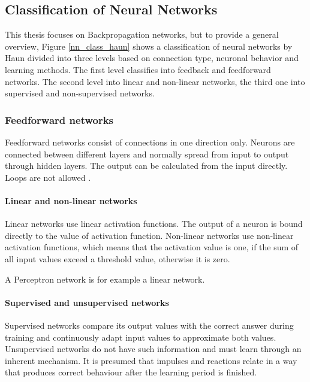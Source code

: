 \subsection{Classification of Neural
Networks}\label{classification-of-neural-networks}

This thesis focuses on Backpropagation networks, but to provide a
general overview, Figure \ref{nn_class_haun} shows a classification of
neural networks by Haun \cite{haun1998simulation} divided into three
levels based on connection type, neuronal behavior and learning methods.
The first level classifies into feedback and feedforward networks. The
second level into linear and non-linear networks, the third one into
supervised and non-supervised networks.

\subsubsection{Feedforward networks}\label{feedforward-networks}

Feedforward networks consist of connections in one direction only.
Neurons are connected between different layers and normally spread from
input to output through hidden layers. The output can be calculated from
the input directly. Loops are not allowed \cite{haun1998simulation}.

\paragraph{Linear and non-linear
networks}\label{linear-and-non-linear-networks}

Linear networks use linear activation functions. The output of a neuron
is bound directly to the value of activation function. Non-linear
networks use non-linear activation functions, which means that the
activation value is one, if the sum of all input values exceed a
threshold value, otherwise it is zero. \cite{haun1998simulation}

A Perceptron network is for example a linear network.

\paragraph{Supervised and unsupervised
networks}\label{supervised-and-unsupervised-networks}

Supervised networks compare its output values with the correct answer
during training and continuously adapt input values to approximate both
values. Unsupervised networks do not have such information and must
learn through an inherent mechanism. It is presumed that impulses and
reactions relate in a way that produces correct behaviour after the
learning period is finished. \cite{haun1998simulation}

